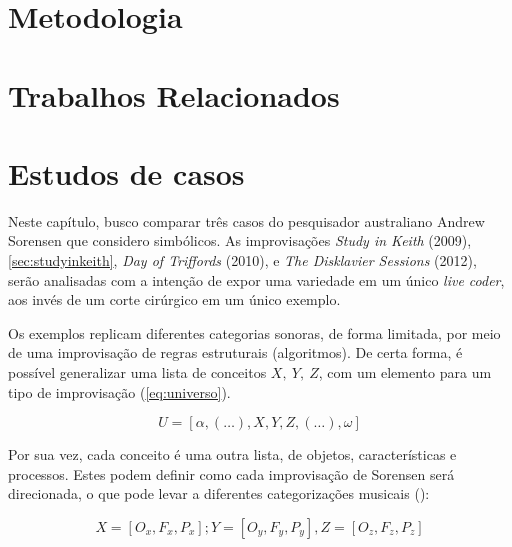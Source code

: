 \documentclass[
	12pt,				%
	openright,			%
	twoside,			%
	a4paper,			%
	english,			%
	french,				%
	spanish,			%
        italian,                        %
	brazil				%
	]{abntex2}
\begin{document}
\chapter{Metodologia}\label{cap:metodologia}


\chapter{Trabalhos Relacionados}\label{cap:trabalhos_relacionados}


\chapter{Estudos de casos}\label{cap:estudos_de_caso}

Neste capítulo, busco comparar três casos do pesquisador australiano Andrew Sorensen que considero simbólicos. As improvisações \emph{Study in Keith} (2009), \autoref{sec:studyinkeith}, \emph{Day of Triffords} (2010), e \emph{The Disklavier Sessions} (2012), serão analisadas com a intenção de expor uma variedade em um único \emph{live coder}, aos invés de um corte cirúrgico em um único exemplo.

Os exemplos replicam diferentes categorias sonoras, de forma limitada, por meio de uma improvisação de regras estruturais (algoritmos). De certa forma, é possível generalizar uma lista de conceitos $X,~Y,~Z$, com um elemento para um tipo de improvisação (\autoref{eq:universo}).

\begin{equation}
U = [\alpha, (\ldots), X, Y, Z, (\ldots), \omega]
\end{equation}\label{eq:universo}

Por sua vez, cada conceito é uma outra lista, de objetos, características e processos. Estes podem definir como cada improvisação de Sorensen será direcionada, o que pode levar a diferentes categorizações musicais (\label{eq:conceitos}):

\begin{equation}
X = [O_x, F_x, P_x]; Y = [O_y, F_y, P_y], Z = [O_z, F_z, P_z]
\end{equation}\label{eq:conceitos}
\end{document}
